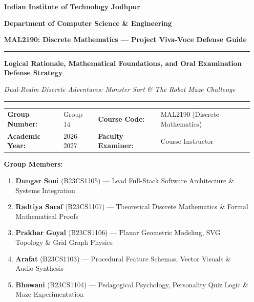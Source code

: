 \documentclass[11pt,a4paper]{article}
\theoremstyle{definition}
\begin{document}
\thispagestyle{plain}

\begin{center}
  {\Large\bfseries\color{primaryblue} Indian Institute of Technology Jodhpur\par}
  \vspace{3pt}
  {\large\bfseries Department of Computer Science \& Engineering\par}
  \vspace{3pt}
  {\large\bfseries MAL2190: Discrete Mathematics --- Project Viva-Voce Defense Guide\par}
  \vspace{8pt}
  \rule{\textwidth}{1pt}\par
  \vspace{6pt}
  {\LARGE\bfseries Logical Rationale, Mathematical Foundations, and Oral Examination Defense Strategy\par}
  \vspace{4pt}
  {\large\textit{Dual-Realm Discrete Adventures: Monster Sort \& The Robot Maze Challenge}\par}
  \vspace{6pt}
  \rule{\textwidth}{1pt}\par
  \vspace{10pt}
\end{center}

\begin{tabularx}{\textwidth}{@{}P{3.5cm}Y P{3.5cm}Y@{}}
\textbf{Group Number:} & Group 14 & \textbf{Course Code:} & MAL2190 (Discrete Mathematics) \\
\textbf{Academic Year:} & 2026--2027 & \textbf{Faculty Examiner:} & Course Instructor \\
\end{tabularx}

\vspace{6pt}
\textbf{Group Members:}
\begin{enumerate}[label=\textbf{\arabic*.}]
  \item \textbf{Dungar Soni} (B23CS1105) --- Lead Full-Stack Software Architecture \& Systems Integration
  \item \textbf{Radtiya Saraf} (B23CS1107) --- Theoretical Discrete Mathematics \& Formal Mathematical Proofs
  \item \textbf{Prakhar Goyal} (B23CS1106) --- Planar Geometric Modeling, SVG Topology \& Grid Graph Physics
  \item \textbf{Arafat} (B23CS1103) --- Procedural Feature Schemas, Vector Visuals \& Audio Synthesis
  \item \textbf{Bhawani} (B23CS1104) --- Pedagogical Psychology, Personality Quiz Logic \& Maze Experimentation
\end{enumerate}
\end{document}
